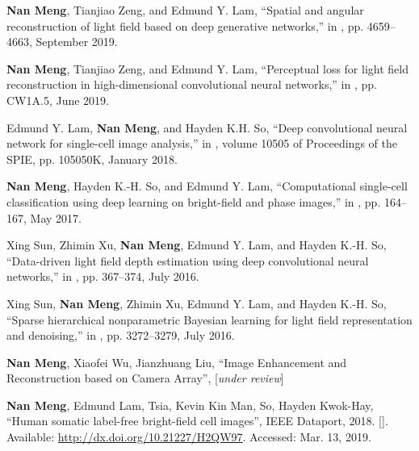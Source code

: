 \begin{publications}
\begin{conferences}
\item \textbf{Nan Meng}, Tianjiao Zeng, and Edmund Y. Lam, ``Spatial and angular reconstruction of light field based on deep generative networks,'' in , pp. 4659–4663, September 2019.

\item \textbf{Nan Meng}, Tianjiao Zeng, and Edmund Y. Lam, ``Perceptual loss for light field reconstruction in high-dimensional convolutional neural networks,'' in , pp. CW1A.5, June 2019.

\item Edmund Y. Lam, \textbf{Nan Meng}, and Hayden K.H. So, ``Deep convolutional neural network for single-cell image analysis,'' in , volume 10505 of Proceedings of the SPIE, pp. 105050K, January 2018.

\item \textbf{Nan Meng}, Hayden K.-H. So, and Edmund Y. Lam, ``Computational single-cell classification using deep learning on bright-field and phase images,'' in , pp. 164–167, May 2017.

\item Xing Sun, Zhimin Xu, \textbf{Nan Meng}, Edmund Y. Lam, and Hayden K.-H. So, ``Data-driven light field depth estimation using deep convolutional neural networks,'' in , pp. 367–374, July 2016.

\item Xing Sun, \textbf{Nan Meng}, Zhimin Xu, Edmund Y. Lam, and Hayden K.-H. So, ``Sparse hierarchical nonparametric Bayesian learning for light field representation and denoising,'' in , pp. 3272–3279, July 2016.
\end{conferences}

\begin{patents}
\item \textbf{Nan Meng}, Xiaofei Wu, Jianzhuang Liu, ``Image Enhancement and Reconstruction based on Camera Array'', [\emph{under review}]
\end{patents}

\begin{datasets}
\item \textbf{Nan Meng}, Edmund Lam, Tsia, Kevin Kin Man, So, Hayden Kwok-Hay, ``Human somatic label-free bright-field cell images'', IEEE Dataport, 2018. []. Available: \url{http://dx.doi.org/10.21227/H2QW97}. Accessed: Mar. 13, 2019.
\end{datasets}

\end{publications}